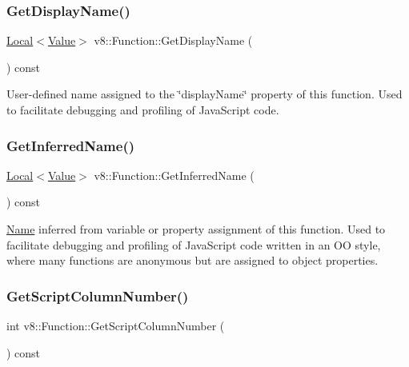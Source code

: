 \subsubsection{\texorpdfstring{Get\+Display\+Name()}{GetDisplayName()}}
{\footnotesize\ttfamily \mbox{\hyperlink{classv8_1_1Local}{Local}}$<$\mbox{\hyperlink{classv8_1_1Value}{Value}}$>$ v8\+::\+Function\+::\+Get\+Display\+Name (\begin{DoxyParamCaption}{ }\end{DoxyParamCaption}) const}

User-\/defined name assigned to the \char`\"{}display\+Name\char`\"{} property of this function. Used to facilitate debugging and profiling of Java\+Script code. \mbox{\label{classv8_1_1Function_aa8cc6843d3df84ff5faf41af41cb07bc}} 
\subsubsection{\texorpdfstring{Get\+Inferred\+Name()}{GetInferredName()}}
{\footnotesize\ttfamily \mbox{\hyperlink{classv8_1_1Local}{Local}}$<$\mbox{\hyperlink{classv8_1_1Value}{Value}}$>$ v8\+::\+Function\+::\+Get\+Inferred\+Name (\begin{DoxyParamCaption}{ }\end{DoxyParamCaption}) const}

\mbox{\hyperlink{classv8_1_1Name}{Name}} inferred from variable or property assignment of this function. Used to facilitate debugging and profiling of Java\+Script code written in an OO style, where many functions are anonymous but are assigned to object properties. \mbox{\label{classv8_1_1Function_a87bc63f97a9a39f83051570519fc63c2}} 
\subsubsection{\texorpdfstring{Get\+Script\+Column\+Number()}{GetScriptColumnNumber()}}
{\footnotesize\ttfamily int v8\+::\+Function\+::\+Get\+Script\+Column\+Number (\begin{DoxyParamCaption}{ }\end{DoxyParamCaption}) const}

